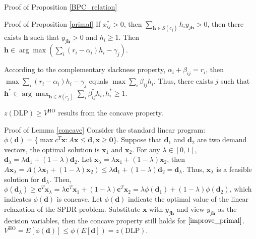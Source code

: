\begin{pf}{Proof of Proposition \ref{BPC_relation}}



\end{pf}

\begin{pf}{Proof of Proposition \ref{primal}}
  If $x_{ij}^{*}>0$, then $\sum_{\bm{h} \in S(c_{j})} h_i y_{j \bm{h}} >0$, then there exists $\bm{h}$ such that $y_{j \bm{h}} >0$ and $h_{i} \geq 1$. Then $\bm{h} \in \arg \max(\sum_{i} (r_{i} - \alpha_{i}) h_{i} - \gamma_{j})$.

  According to the complementary slackness property, $\alpha_{i} + \beta_{ij} = r_{i}$, then $\max \sum_{i} (r_{i} - \alpha_{i}) h_{i} - \gamma_{j}$ equals $\max \sum_{i} \beta_{ij} h_{i}$. Thus, there exists $j$ such that $\bm{h}^{*} \in \arg\max_{\bm{h} \in S(c_j)} \sum_{i} \beta_{ij}^{\dag} h_{i}, h_{i}^{*} \geq 1$.
 
\end{pf}

\begin{lem}\label{concave}
  $z(\text{DLP}) \geq V^{\text{HO}}$ results from the concave property. 
\end{lem}  

\begin{pf}{Proof of Lemma \ref{concave}}
  Consider the standard linear program: $\phi(\bm{d})= \{\max c^{T} \bm{x}: A \bm{x} \leq \bm{d}, \bm{x} \geq \bm{0}\}$.  Suppose that $\bm{d}_1$ and $\bm{d}_2$ are two demand vectors, the optimal solution is $\bm{x}_1$ and $\bm{x}_2$. For any $\lambda \in [0, 1]$, $\bm{d}_{\lambda} = \lambda \bm{d}_{1} + (1- \lambda) \bm{d}_{2}$. Let $\bm{x}_{\lambda} = \lambda \bm{x}_{1} + (1-\lambda) \bm{x}_{2}$, then $A \bm{x}_{\lambda} = A(\lambda \bm{x}_{1} + (1-\lambda) \bm{x}_{2}) \leq \lambda \bm{d}_{1} + (1- \lambda) \bm{d}_{2} = \bm{d}_{\lambda}$. Thus, $\bm{x}_{\lambda}$ is a feasible solution for $\bm{d}_{\lambda}$. Then, $\phi(\bm{d}_{\lambda}) \geq \bm{c}^{T} \bm{x}_{\lambda} = \lambda \bm{c}^{T} \bm{x}_{1} + (1-\lambda) \bm{c}^{T} \bm{x}_{2} = \lambda \phi(\bm{d}_{1}) + (1- \lambda) \phi(\bm{d}_{2})$, which indicates $\phi(\bm{d})$ is concave. Let $\phi(\bm{d})$ indicate the optimal value of the linear relaxation of the SPDR problem. Substitute $\bm{x}$ with $y_{j \bm{h}}$ and view $y_{j \bm{h}}$ as the decision variables, then the concave property still holds for $\eqref{improve_primal}$. $V^{\text{HO}} = E[\phi(\bm{d})] \leq \phi(E[\bm{d}]) = z(\text{DLP})$.
\end{pf}

\newpage